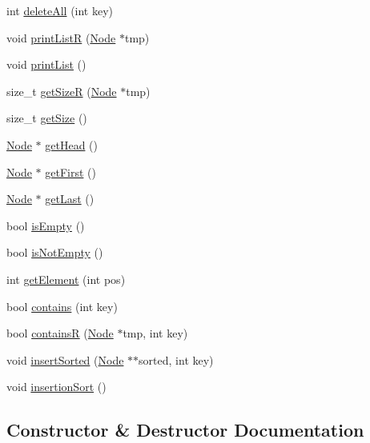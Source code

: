 \begin{DoxyCompactItemize}
int \hyperlink{class_linked_list_a8b00d7145aa7ee83ba2e49623285e371}{delete\+All} (int key)
\item 
void \hyperlink{class_linked_list_a2d03b30bf762af404a7a687aceff7123}{print\+ListR} (\hyperlink{class_node}{Node} $\ast$tmp)
\item 
void \hyperlink{class_linked_list_ac96230938fd74a4efeb4efe8c995ee53}{print\+List} ()
\item 
size\+\_\+t \hyperlink{class_linked_list_af4b27646ebfb44d2fd0625b8ad1fb136}{get\+SizeR} (\hyperlink{class_node}{Node} $\ast$tmp)
\item 
size\+\_\+t \hyperlink{class_linked_list_ac8d24166208694f4fe3cc982307b03fb}{get\+Size} ()
\item 
\hyperlink{class_node}{Node} $\ast$ \hyperlink{class_linked_list_a1cba1fc059374f4d263bf5bece9fa136}{get\+Head} ()
\item 
\hyperlink{class_node}{Node} $\ast$ \hyperlink{class_linked_list_a744fc291de7eff0b934e7b594449fa10}{get\+First} ()
\item 
\hyperlink{class_node}{Node} $\ast$ \hyperlink{class_linked_list_ad07d8659b87f77e9fb98a80eb71ed77a}{get\+Last} ()
\item 
bool \hyperlink{class_linked_list_a03ff22f881325da2d37f640ab2380bf2}{is\+Empty} ()
\item 
bool \hyperlink{class_linked_list_a1a5c8f3b415fa55f7e876cf4a01f3380}{is\+Not\+Empty} ()
\item 
int \hyperlink{class_linked_list_a2866982bfe5f87a2a265d1e2ec3e43ed}{get\+Element} (int pos)
\item 
bool \hyperlink{class_linked_list_ac2fac6f86f1891576b57c2866ff77803}{contains} (int key)
\item 
bool \hyperlink{class_linked_list_a67c86ff482738c1ab36bb8c764a7f3f7}{containsR} (\hyperlink{class_node}{Node} $\ast$tmp, int key)
\item 
void \hyperlink{class_linked_list_ac517f07c7f197202fa085246fb3f07e8}{insert\+Sorted} (\hyperlink{class_node}{Node} $\ast$$\ast$sorted, int key)
\item 
void \hyperlink{class_linked_list_a04e277f98f8e6e5426f19ad780915e00}{insertion\+Sort} ()
\end{DoxyCompactItemize}


\subsection{Constructor \& Destructor Documentation}
\mbox{\label{class_linked_list_afe7f78983e173f8018927cf2ad11a5aa}} 
